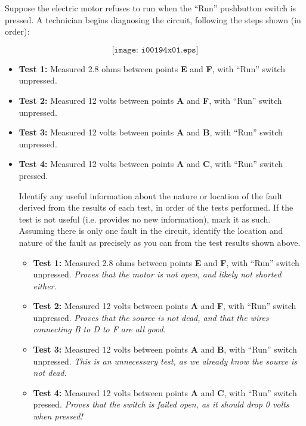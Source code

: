 

Suppose the electric motor refuses to run when the ``Run'' pushbutton switch is pressed.  A technician begins diagnosing the circuit, following the steps shown (in order):

$$\texttt{[image: i00194x01.eps]}$$

\begin{itemize}
\item{} {\bf Test 1:} Measured 2.8 ohms between points {\bf E} and {\bf F}, with ``Run'' switch unpressed.
\vskip 25pt
\item{} {\bf Test 2:} Measured 12 volts between points {\bf A} and {\bf F}, with ``Run'' switch unpressed.
\vskip 25pt
\item{} {\bf Test 3:} Measured 12 volts between points {\bf A} and {\bf B}, with ``Run'' switch unpressed.
\vskip 25pt
\item{} {\bf Test 4:} Measured 12 volts between points {\bf A} and {\bf C}, with ``Run'' switch pressed.
\vskip 25pt
\medskip

Identify any useful information about the nature or location of the fault derived from the results of each test, in order of the tests performed.  If the test is not useful (i.e. provides no new information), mark it as such.  Assuming there is only one fault in the circuit, identify the location and nature of the fault as precisely as you can from the test results shown above.

\vfil 

\eject






\begin{itemize}
\item{} {\bf Test 1:} Measured 2.8 ohms between points {\bf E} and {\bf F}, with ``Run'' switch unpressed.  {\it Proves that the motor is not open, and likely not shorted either.}
\vskip 5pt
\item{} {\bf Test 2:} Measured 12 volts between points {\bf A} and {\bf F}, with ``Run'' switch unpressed.  {\it Proves that the source is not dead, and that the wires connecting B to D to F are all good.}
\vskip 5pt
\item{} {\bf Test 3:} Measured 12 volts between points {\bf A} and {\bf B}, with ``Run'' switch unpressed.  {\it This is an unnecessary test, as we already know the source is not dead.}
\vskip 5pt
\item{} {\bf Test 4:} Measured 12 volts between points {\bf A} and {\bf C}, with ``Run'' switch pressed.  {\it Proves that the switch is failed open, as it should drop 0 volts when pressed!}
\end{itemize}


\end{itemize}
